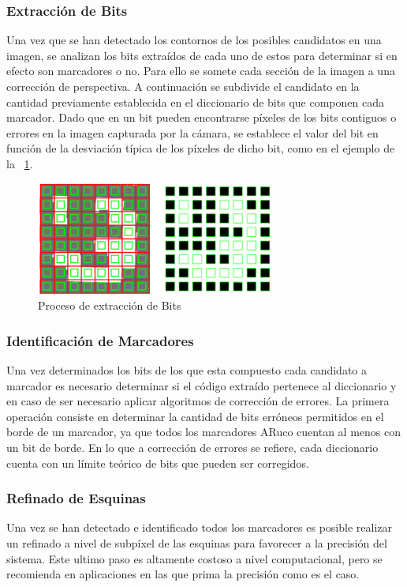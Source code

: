 \subsubsection*{Extracción de Bits}
Una vez que se han detectado los contornos de los posibles candidatos en una imagen, se analizan los bits extraídos de cada uno de estos para determinar si en efecto son marcadores o no.
Para ello se somete cada sección de la imagen a una corrección de perspectiva. A continuación se subdivide el candidato en la cantidad previamente establecida en el diccionario de bits que componen cada marcador. Dado que en un bit pueden encontrarse píxeles de los bits contiguos o errores en la imagen capturada por la cámara, se establece el valor del bit en función de la desviación típica de los píxeles de dicho bit, como en el ejemplo de la \figurename~\ref{fig:mbe}.

\begin{figure}
  \centering
  \includegraphics[width=0.7\textwidth]{imaxes/marker_bits_extraction.png}
  \caption{Proceso de extracción de Bits}
  \label{fig:mbe}
\end{figure}

\subsubsection*{Identificación de Marcadores}
Una vez determinados los bits de los que esta compuesto cada candidato a marcador es necesario determinar si el código extraído pertenece al diccionario y en caso de ser necesario aplicar algoritmos de corrección de errores.
La primera operación consiste en determinar la cantidad de bits erróneos permitidos en el borde de un marcador, ya que todos los marcadores ARuco cuentan al menos con un bit de borde. En lo que a corrección de errores se refiere, cada diccionario cuenta con un límite teórico de bits que pueden ser corregidos.

\subsubsection*{Refinado de Esquinas}
Una vez se han detectado e identificado todos los marcadores es posible realizar  un refinado a nivel de subpíxel de las esquinas para favorecer a la precisión del sistema. Este ultimo paso es altamente costoso a nivel computacional, pero se recomienda en aplicaciones en las que prima la precisión como es el caso.

